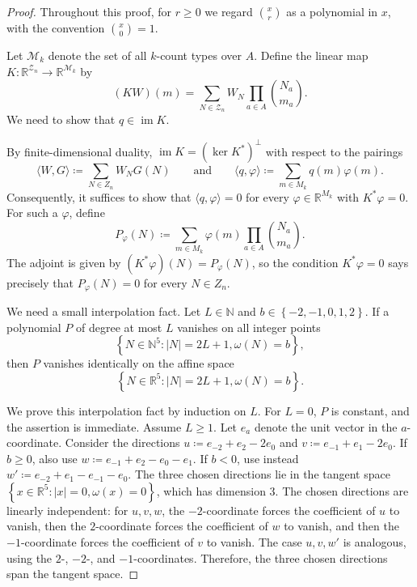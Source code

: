 \documentclass[10pt,a4paper]{amsart}
\newcommand{\N}{\mathbb N}
\newcommand{\R}{\mathbb R}
\begin{document}
\begin{proof}
Throughout this proof, for \(r\ge0\) we regard \(\binom{x}{r}\) as a polynomial in \(x\), with the convention \(\binom{x}{0}=1\).

Let \(\mathcal M_k\) denote the set of all \(k\)-count types over \(A\). Define the linear map \(K\colon\R^{\mathcal Z_n}\to\R^{\mathcal M_k}\) by
\[
\left(KW\right)\left(m\right)=\sum_{N\in\mathcal Z_n}W_N\prod_{a\in A}\binom{N_a}{m_a}.
\]
We need to show that \(q\in\operatorname{im}K\).

By finite-dimensional duality, \(\operatorname{im}K=\left(\ker K^*\right)^\perp\) with respect to the pairings
\[
\langle W,G\rangle\coloneqq\sum_{N\in Z_n}W_NG(N)
\qquad \text{and} \qquad
\langle q,\varphi\rangle\coloneqq\sum_{m\in M_k}q(m)\varphi(m).
\]
Consequently, it suffices to show that \(\langle q,\varphi\rangle=0\) for every \(\varphi\in\mathbb R^{M_k}\) with \(K^*\varphi=0\). For such a \(\varphi\), define
\[
P_\varphi(N)\coloneqq\sum_{m\in M_k}\varphi(m)\prod_{a\in A}\binom{N_a}{m_a}.
\]
The adjoint is given by \((K^*\varphi)(N)=P_\varphi(N)\), so the condition \(K^*\varphi=0\) says precisely that \(P_\varphi(N)=0\) for every \(N\in Z_n\).

We need a small interpolation fact. Let \(L\in\N\) and \(b\in\left\{-2,-1,0,1,2\right\}\). If a polynomial \(P\) of degree at most \(L\) vanishes on all integer points
\[
\left\{N\in\N^5\colon\lvert N\rvert=2L+1,\omega\left(N\right)=b\right\},
\]
then \(P\) vanishes identically on the affine space
\[
\left\{N\in\R^5\colon\lvert N\rvert=2L+1,\omega\left(N\right)=b\right\}.
\]

We prove this interpolation fact by induction on \(L\). For \(L=0\), \(P\) is constant, and the assertion is immediate. Assume \(L\ge1\). Let \(e_a\) denote the unit vector in the \(a\)-coordinate. Consider the directions \(u\coloneqq e_{-2}+e_2-2e_0\) and \(v\coloneqq e_{-1}+e_1-2e_0\). If \(b\ge0\), also use \(w\coloneqq e_{-1}+e_2-e_0-e_1\). If \(b<0\), use instead \(w'\coloneqq e_{-2}+e_1-e_{-1}-e_0\). The three chosen directions lie in the tangent space \(\left\{x\in\R^5\colon\lvert x\rvert=0,\omega\left(x\right)=0\right\}\), which has dimension \(3\). The chosen directions are linearly independent: for \(u,v,w\), the \(-2\)-coordinate forces the coefficient of \(u\) to vanish, then the \(2\)-coordinate forces the coefficient of \(w\) to vanish, and then the \(-1\)-coordinate forces the coefficient of \(v\) to vanish. The case \(u,v,w'\) is analogous, using the \(2\)-, \(-2\)-, and \(-1\)-coordinates. Therefore, the three chosen directions span the tangent space.


\end{proof}
\end{document}

